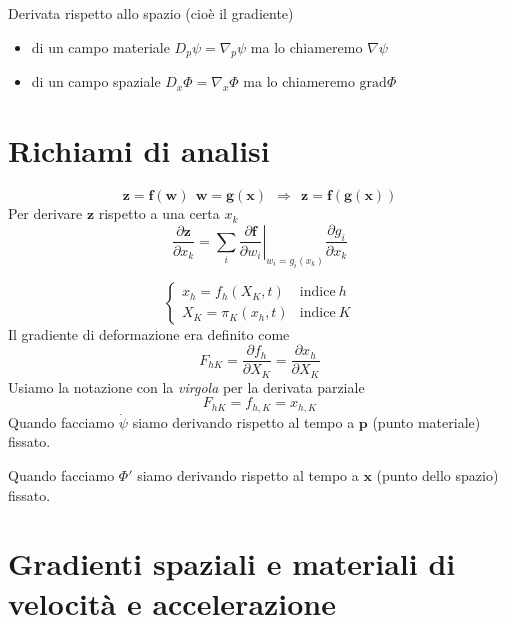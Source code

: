 \documentclass[10pt,a4paper,twoside]{book}
\begin{document}
Derivata rispetto allo spazio (cioè il gradiente)
\begin{itemize}
\item di un campo materiale $D_{p} \psi =\nabla _{p} \psi $ ma lo chiameremo $\nabla \psi $
\item di un campo spaziale $D_{x} \Phi =\nabla _{x} \Phi $ ma lo chiameremo $\mathrm{grad} \Phi $
\end{itemize}
\section{Richiami di analisi}
\begin{equation*}
\mathbf{z} =\mathbf{f}(\mathbf{w}) \ \ \mathbf{w} =\mathbf{g}(\mathbf{x}) \ \ \Rightarrow \ \ \mathbf{z} =\mathbf{f}(\mathbf{g}(\mathbf{x}))
\end{equation*}
Per derivare $\mathbf{z}$ rispetto a una certa $x_{k}$
\begin{equation}
\boxed{\frac{\partial \mathbf{z}}{\partial x_{k}} =\sum\limits _{i}\left. \frac{\partial \mathbf{f}}{\partial w_{i}}\right| _{w_{i} =g_{i}( x_{k})}\frac{\partial g_{i}}{\partial x_{k}}}
\end{equation}


\begin{equation*}
\begin{cases}
x_{h} =f_{h}( X_{K} ,t) & \text{indice} \ h\\
X_{K} =\pi _{K}( x_{h} ,t) & \text{indice} \ K
\end{cases}
\end{equation*}
Il gradiente di deformazione era definito come
\begin{equation*}
F_{hK} =\frac{\partial f_{h}}{\partial X_{K}} =\frac{\partial x_{h}}{\partial X_{K}}
\end{equation*}
Usiamo la notazione con la \textit{virgola} per la derivata parziale
\begin{equation*}
F_{hK} =f_{h,K} =x_{h,K}
\end{equation*}
Quando facciamo $\dot{\psi }$ siamo derivando rispetto al tempo a $\mathbf{p}$ (punto materiale) fissato.

Quando facciamo $\Phi '$ siamo derivando rispetto al tempo a $\mathbf{x}$ (punto dello spazio) fissato.
\section{Gradienti spaziali e materiali di velocità e accelerazione}
\end{document}
